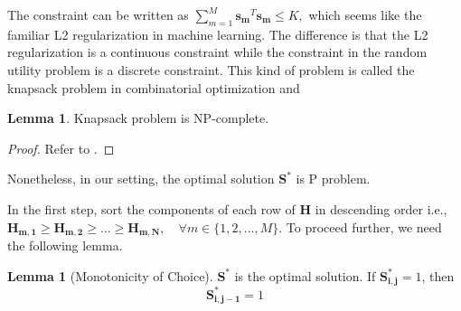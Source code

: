 \documentclass[12pt]{article}
\theoremstyle{definition}
\newtheorem{lemma}[theorem]{Lemma}
\newcommand{\matr}[1]{\mathbf{#1}} %
\begin{document}
\begin{sloppypar}
The constraint can be written as $\sum_{m=1}^{M}\matr{s_m}^T\matr{s_m} \leq K,$ which seems like the familiar L2 regularization in machine learning. The difference is that the L2 regularization is a continuous constraint while the constraint in the random utility problem is a discrete constraint. This kind of problem is called the knapsack problem in combinatorial optimization and
\begin{lemma}
    Knapsack problem is NP-complete.
\end{lemma}
\begin{proof}
    Refer to \textcite{garey1990}.
\end{proof}
Nonetheless, in our setting, the optimal solution $\matr{S}^*$ is P problem.

In the first step, sort the components of each row of $\matr{H}$ in descending order i.e., $\matr{H_{m,1}} \geq \matr{H_{m,2}} \geq ... \geq \matr{H_{m,N}}, \quad \forall m \in \{1,2,...,M\}$. To proceed further, we need the following lemma.
\begin{lemma}[Monotonicity of Choice]\label{lemma1}
    $\matr{S^*}$ is the optimal solution. If $\matr{S^*_{i,j}} = 1$, then
    \begin{equation*}
        \matr{S^*_{i,j-1}} = 1
    \end{equation*}
\end{lemma}


\end{sloppypar}
\end{document}
